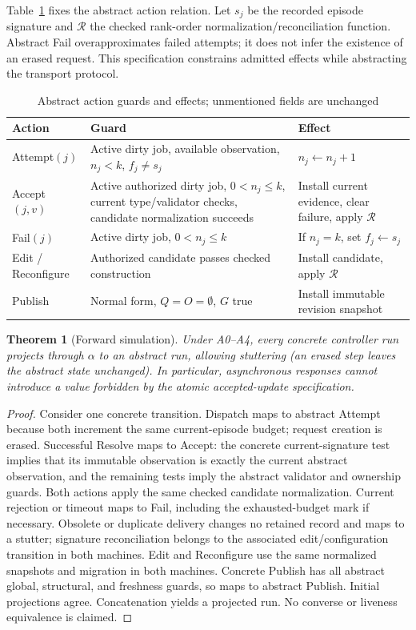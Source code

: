 \documentclass[pdflatex,sn-mathphys-num]{sn-jnl}
\theoremstyle{thmstyleone}
\newtheorem{theorem}{Theorem}
\theoremstyle{thmstylethree}
\theoremstyle{thmstyletwo}
\begin{document}
Table~\ref{tab:abstract} fixes the abstract action relation. Let $s_j$ be the recorded episode signature and $\mathcal R$ the checked rank-order normalization/reconciliation function. Abstract Fail overapproximates failed attempts; it does not infer the existence of an erased request. This specification constrains admitted effects while abstracting the transport protocol.
\begin{table}[tb]
\caption{Abstract action guards and effects; unmentioned fields are unchanged}\label{tab:abstract}
\small\begin{tabularx}{\linewidth}{@{}lXX@{}}\toprule
Action & Guard & Effect\\\midrule
Attempt$(j)$ & Active dirty job, available observation, $n_j<k$, $f_j\ne s_j$ & $n_j\gets n_j+1$\\
Accept$(j,v)$ & Active authorized dirty job, $0<n_j\leq k$, current type/validator checks, candidate normalization succeeds & Install current evidence, clear failure, apply $\mathcal R$\\
Fail$(j)$ & Active dirty job, $0<n_j\leq k$ & If $n_j=k$, set $f_j\gets s_j$\\
Edit / Reconfigure & Authorized candidate passes checked construction & Install candidate, apply $\mathcal R$\\
Publish & Normal form, $Q=O=\emptyset$, $G$ true & Install immutable revision snapshot\\\bottomrule
\end{tabularx}
\end{table}

\begin{theorem}[Forward simulation]\label{thm:refinement}
Under A0--A4, every concrete controller run projects through $\alpha$ to an abstract run, allowing stuttering (an erased step leaves the abstract state unchanged). In particular, asynchronous responses cannot introduce a value forbidden by the atomic accepted-update specification.
\end{theorem}
\begin{proof}
Consider one concrete transition. Dispatch maps to abstract Attempt because both increment the same current-episode budget; request creation is erased. Successful Resolve maps to Accept: the concrete current-signature test implies that its immutable observation is exactly the current abstract observation, and the remaining tests imply the abstract validator and ownership guards. Both actions apply the same checked candidate normalization. Current rejection or timeout maps to Fail, including the exhausted-budget mark if necessary. Obsolete or duplicate delivery changes no retained record and maps to a stutter; signature reconciliation belongs to the associated edit/configuration transition in both machines. Edit and Reconfigure use the same normalized snapshots and migration in both machines. Concrete Publish has all abstract global, structural, and freshness guards, so maps to abstract Publish. Initial projections agree. Concatenation yields a projected run. No converse or liveness equivalence is claimed.\qedhere
\end{proof}
\end{document}
